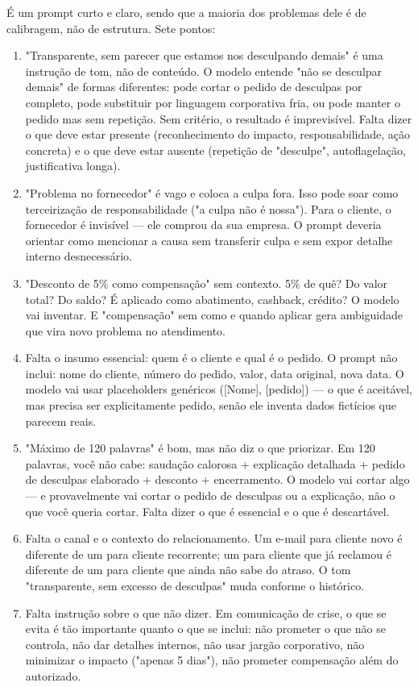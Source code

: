 \documentclass[11pt, a4paper]{article}
\begin{document}
É um prompt curto e claro, sendo que a maioria dos problemas dele é de calibragem, não de estrutura. Sete pontos:
\begin{enumerate}
	\item "Transparente, sem parecer que estamos nos desculpando demais" é uma instrução de tom, não de conteúdo. O modelo entende "não se desculpar demais" de formas diferentes: pode cortar o pedido de desculpas por completo, pode substituir por linguagem corporativa fria, ou pode manter o pedido mas sem repetição. Sem critério, o resultado é imprevisível. Falta dizer o que deve estar presente (reconhecimento do impacto, responsabilidade, ação concreta) e o que deve estar ausente (repetição de "desculpe", autoflagelação, justificativa longa).
	\item "Problema no fornecedor" é vago e coloca a culpa fora. Isso pode soar como terceirização de responsabilidade ("a culpa não é nossa"). Para o cliente, o fornecedor é invisível — ele comprou da sua empresa. O prompt deveria orientar como mencionar a causa sem transferir culpa e sem expor detalhe interno desnecessário.
	\item "Desconto de 5\% como compensação" sem contexto. 5\% de quê? Do valor total? Do saldo? É aplicado como abatimento, cashback, crédito? O modelo vai inventar. E "compensação" sem como e quando aplicar gera ambiguidade que vira novo problema no atendimento.
	\item Falta o insumo essencial: quem é o cliente e qual é o pedido. O prompt não inclui: nome do cliente, número do pedido, valor, data original, nova data. O modelo vai usar placeholders genéricos ([Nome], [pedido]) — o que é aceitável, mas precisa ser explicitamente pedido, senão ele inventa dados fictícios que parecem reais.
	\item "Máximo de 120 palavras" é bom, mas não diz o que priorizar. Em 120 palavras, você não cabe: saudação calorosa + explicação detalhada + pedido de desculpas elaborado + desconto + encerramento. O modelo vai cortar algo — e provavelmente vai cortar o pedido de desculpas ou a explicação, não o que você queria cortar. Falta dizer o que é essencial e o que é descartável.
	\item Falta o canal e o contexto do relacionamento. Um e-mail para cliente novo é diferente de um para cliente recorrente; um para cliente que já reclamou é diferente de um para cliente que ainda não sabe do atraso. O tom "transparente, sem excesso de desculpas" muda conforme o histórico.
	\item Falta instrução sobre o que não dizer. Em comunicação de crise, o que se evita é tão importante quanto o que se inclui: não prometer o que não se controla, não dar detalhes internos, não usar jargão corporativo, não minimizar o impacto ("apenas 5 dias"), não prometer compensação além do autorizado.
\end{enumerate}
\end{document}
